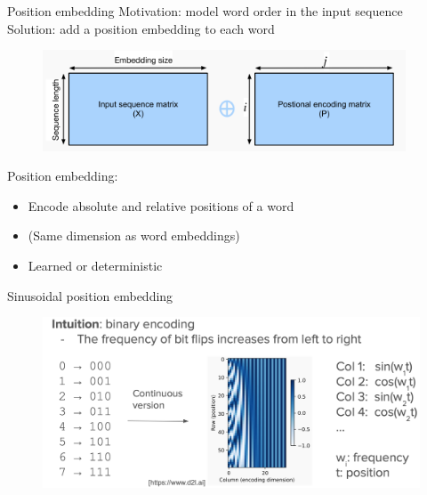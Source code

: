 \documentclass[usenames,dvipsnames,notes,11pt,aspectratio=169,hyperref={colorlinks=true, linkcolor=blue}]{beamer}
\begin{document}
\begin{frame}
    {Position embedding}
    Motivation: model word order in the input sequence\\
    Solution: add a position embedding to each word
    \begin{figure}
        \includegraphics[height=3cm]{figures/position-embedding}
    \end{figure}

    Position embedding:\\
    \begin{itemize}
        \item Encode absolute and relative positions of a word
        \item (Same dimension as word embeddings)
        \item Learned or deterministic 
    \end{itemize}
\end{frame}

\begin{frame}
    {Sinusoidal position embedding}
    \begin{figure}
        \includegraphics[width=\textwidth]{figures/sinusoidal}
    \end{figure}
\end{frame}
\end{document}
